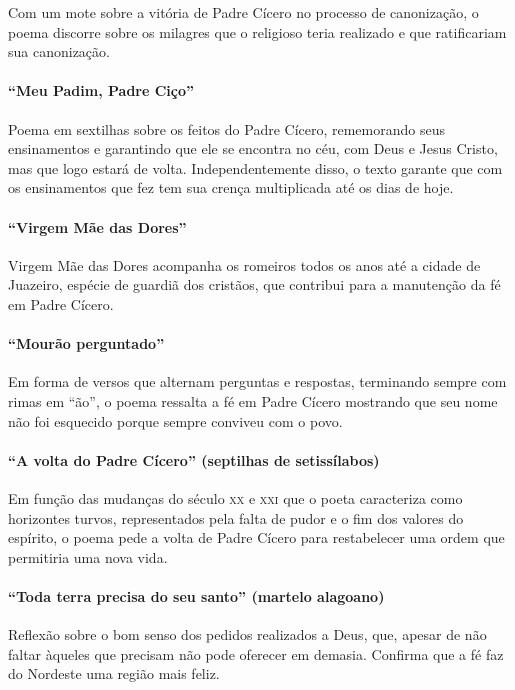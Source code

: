 Com um mote sobre a vitória de Padre Cícero no processo de canonização,
o poema discorre sobre os milagres que o religioso teria realizado e
que ratificariam sua canonização.

\paragraph{``Meu Padim, Padre Ciço''}

Poema em sextilhas sobre os feitos do Padre Cícero, rememorando seus
ensinamentos e garantindo que ele se encontra no céu, com Deus e Jesus
Cristo, mas que logo estará de volta. Independentemente disso, o texto
garante que com os ensinamentos que fez tem sua crença multiplicada até
os dias de hoje.

\paragraph{``Virgem Mãe das Dores''}

Virgem Mãe das Dores acompanha os romeiros todos os anos até a cidade de
Juazeiro, espécie de guardiã dos cristãos, que contribui para a manutenção da
fé em Padre Cícero.

\paragraph{``Mourão perguntado''}

Em forma de versos que alternam perguntas e respostas, terminando sempre
com rimas em ``ão'', o poema
ressalta a fé em Padre Cícero mostrando que seu nome não foi esquecido
porque sempre conviveu com o povo.

\paragraph{``A volta do Padre Cícero'' (septilhas de setissílabos) }

Em função das mudanças do século \textsc{xx} e \textsc{xxi} que o poeta caracteriza como
horizontes turvos, representados pela falta de pudor e o fim dos
valores do espírito, o poema pede a volta de Padre Cícero para
restabelecer uma ordem que permitiria uma nova vida.

\paragraph{``Toda terra precisa do seu santo'' (martelo alagoano)}

Reflexão sobre o bom senso dos pedidos realizados a Deus, que, 
apesar de não faltar àqueles que precisam não pode oferecer em demasia.
Confirma que a fé faz do Nordeste uma região mais feliz.

